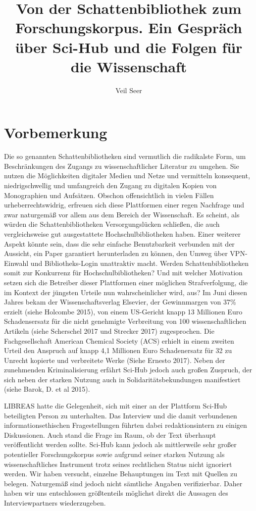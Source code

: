 \documentclass[a4paper,
fontsize=11pt,
oneside,
numbers=noperiodatend,
parskip=half-,
bibliography=totoc,
final
]{scrartcl}
\title{\LARGE{Von der Schattenbibliothek zum Forschungskorpus. Ein Gespräch über Sci-Hub und die Folgen für die Wissenschaft}} %
\author{Veil Seer} %
\date{}
\begin{document}
\maketitle
\thispagestyle{fancyplain} 


\hypertarget{vorbemerkung}{%
\section*{Vorbemerkung}\label{vorbemerkung}}

Die so genannten Schattenbibliotheken sind vermutlich die radikalste
Form, um Beschränkungen des Zugangs zu wissenschaftlicher Literatur zu
umgehen. Sie nutzen die Möglichkeiten digitaler Medien und Netze und
vermitteln konsequent, niedrigschwellig und umfangreich den Zugang zu
digitalen Kopien von Monographien und Aufsätzen. Obschon offensichtlich
in vielen Fällen urheberrechtswidrig, erfreuen sich diese Plattformen
einer regen Nachfrage und zwar naturgemäß vor allem aus dem Bereich der
Wissenschaft. Es scheint, als würden die Schattenbibliotheken
Versorgungslücken schließen, die auch vergleichsweise gut ausgestattete
Hochschulbibliotheken haben. Einer weiterer Aspekt könnte sein, dass die
sehr einfache Benutzbarkeit verbunden mit der Aussicht, ein Paper
garantiert herunterladen zu können, den Umweg über VPN-Einwahl und
Bibliotheks-Login unattraktiv macht. Werden Schattenbibliotheken somit
zur Konkurrenz für Hochschulbibliotheken? Und mit welcher Motivation
setzen sich die Betreiber dieser Plattformen einer möglichen
Strafverfolgung, die im Kontext der jüngsten Urteile nun
wahrscheinlicher wird, aus? Im Juni diesen Jahres bekam der
Wissenschaftsverlag Elsevier, der Gewinnmargen von 37\% erzielt (siehe
Holcombe 2015), von einem US-Gericht knapp 13 Millionen Euro
Schadensersatz für die nicht genehmigte Verbreitung von 100
wissenschaftlichen Artikeln (siehe Scherschel 2017 und Strecker 2017)
zugesprochen. Die Fachgesellschaft American Chemical Society (ACS)
erhielt in einem zweiten Urteil den Anspruch auf knapp 4,1 Millionen
Euro Schadenersatz für 32 zu Unrecht kopierte und verbreitete Werke
(Siehe Ernesto 2017). Neben der zunehmenden Kriminalisierung erfährt
Sci-Hub jedoch auch großen Zuspruch, der sich neben der starken Nutzung
auch in Solidaritätsbekundungen manifestiert (siehe Barok, D. et al
2015).

LIBREAS hatte die Gelegenheit, sich mit einer an der Plattform Sci-Hub
beteiligten Person zu unterhalten. Das Interview und die damit
verbundenen informationsethischen Fragestellungen führten dabei
redaktionsintern zu einigen Diskussionen. Auch stand die Frage im Raum,
ob der Text überhaupt veröffentlicht werden sollte. Sci-Hub kann jedoch
als mittlerweile sehr großer potentieller Forschungskorpus sowie
aufgrund seiner starken Nutzung als wissenschaftliches Instrument trotz
seines rechtlichen Status nicht ignoriert werden. Wir haben versucht,
einzelne Behauptungen im Text mit Quellen zu belegen. Naturgemäß sind
jedoch nicht sämtliche Angaben verifizierbar. Daher haben wir uns
entschlossen größtenteils möglichst direkt die Aussagen des
Interviewpartners wiederzugeben.
\end{document}
